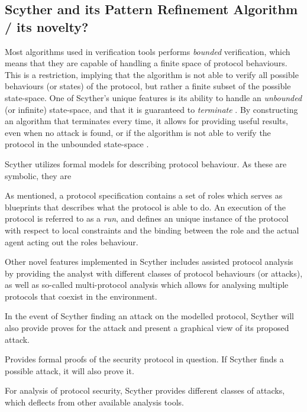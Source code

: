 
\subsection{Scyther and its Pattern Refinement Algorithm / its novelty?}

Most algorithms used in verification tools performs \emph{bounded} verification, which means that they are capable of handling a finite space of protocol behaviours. This is a restriction, implying that the algorithm is not able to verify all possible behaviours (or states) of the protocol, but rather a finite subset of the possible state-space. One of Scyther's unique features is its ability to handle an \emph{unbounded} (or infinite) state-space, and that it is guaranteed to \emph{terminate} \cite{cremers2008unbounded}. By constructing an algorithm that terminates every time, it allows for providing useful results, even when no attack is found, or if the algorithm is not able to verify the protocol in the unbounded state-space \cite{cremers2008scyther}.

Scyther utilizes formal models for describing protocol behaviour. As these are symbolic, they are 



As mentioned, a protocol specification contains a set of roles which serves as blueprints that describes what the protocol is able to do. An execution of the protocol is referred to as a \emph{run}, and defines an unique instance of the protocol with respect to local constraints and the binding between the role and the actual agent acting out the roles behaviour. 

Other novel features implemented in Scyther includes assisted protocol analysis by providing the analyst with different classes of protocol behaviours (or attacks), as well as so-called multi-protocol analysis which allows for analysing multiple protocols that coexist in the environment.



In the event of Scyther finding an attack on the modelled protocol, Scyther will also provide proves for the attack and present a graphical view of its proposed attack.

Provides formal proofs of the security protocol in question. If Scyther finds a possible attack, it will also prove it.



For analysis of protocol security, Scyther provides different classes of attacks, which deflects from other available analysis tools.



